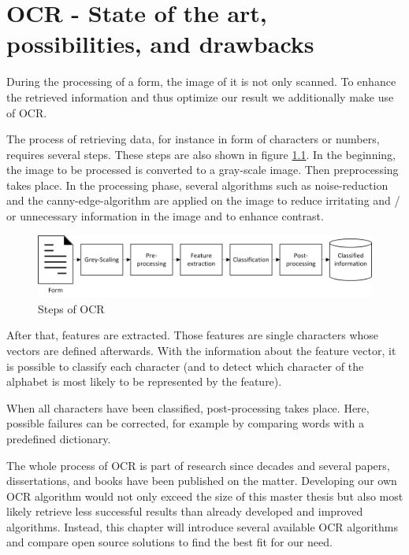 %
% 
\chapter{OCR - State of the art, possibilities, and drawbacks}
\label{cha3}

During the processing of a form, the image of it is not only scanned. To enhance the retrieved information and thus optimize our result we additionally make use of OCR.

The process of retrieving data, for instance in form of characters or numbers, requires several steps. These steps are also shown in figure \ref{ocrSteps}. In the beginning, the image to be processed is converted to a gray-scale image. Then preprocessing takes place. In the processing phase, several algorithms such as noise-reduction and the canny-edge-algorithm are applied on the image to reduce irritating and / or unnecessary information in the image and to enhance contrast.

\begin{figure}[htbp!]
\centering
\includegraphics[scale=0.9]{Images/OCR/Steps_Of_OCR.png}
\caption{Steps of OCR \label{ocrSteps}}
\end{figure}

After that, features are extracted. Those features are single characters whose vectors are defined afterwards. With the information about the feature vector, it is possible to classify each character (and to detect which character of the alphabet is most likely to be represented by the feature).

When all characters have been classified, post-processing takes place. Here, possible failures can be corrected, for example by comparing words with a predefined dictionary.

The whole process of OCR is part of research since decades and several papers, dissertations, and books have been published on the matter\cite{impedovo91}\cite{Mori99}\cite{Wang15}. Developing our own OCR algorithm would not only exceed the size of this master thesis but also most likely retrieve less successful results than already developed and improved algorithms. Instead, this chapter will introduce several available OCR algorithms and compare open source solutions to find the best fit for our need.

